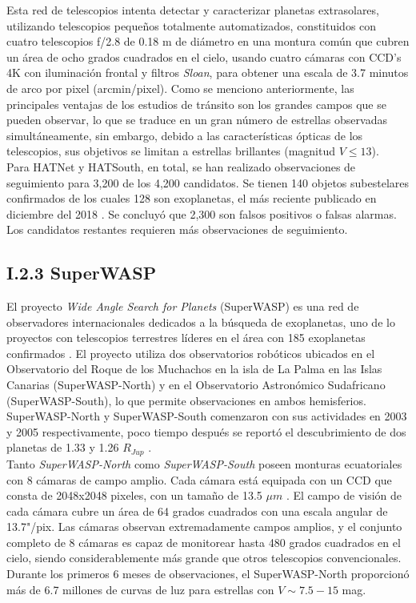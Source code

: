 Esta red de telescopios intenta detectar y caracterizar planetas extrasolares, utilizando telescopios pequeños totalmente automatizados, constituidos con cuatro telescopios f/2.8 de 0.18 m de diámetro en una montura común que cubren un área de ocho grados cuadrados en el cielo, usando cuatro cámaras con CCD's 4K con iluminación frontal y filtros \textit{Sloan}, para obtener una escala de 3.7 minutos de arco por pixel (arcmin/pixel). Como se menciono anteriormente, las principales ventajas de los estudios de tránsito son los grandes campos que se pueden observar, lo que se traduce en un gran número de estrellas observadas simultáneamente, sin embargo, debido a las características ópticas de los telescopios, sus objetivos se limitan a estrellas brillantes (magnitud $V \leq 13$).\\

Para HATNet y HATSouth, en total, se han realizado observaciones de seguimiento para 3,200 de los 4,200 candidatos. Se tienen 140 objetos subestelares confirmados de los cuales 128 son exoplanetas, el más reciente publicado en diciembre del 2018 \cite{bakos2018hats}. Se concluyó que 2,300 son falsos positivos o falsas alarmas. Los candidatos restantes requieren más observaciones de seguimiento.\\

\subsection*{I.2.3 SuperWASP}

El proyecto \textit{Wide Angle Search for Planets} (SuperWASP) es una red de observadores internacionales dedicados a la búsqueda de exoplanetas, uno de lo proyectos con telescopios terrestres líderes en el área con 185 exoplanetas confirmados \cite{pollacco2006wasp}. El proyecto utiliza dos observatorios robóticos ubicados en el Observatorio del Roque de los Muchachos en la isla de La Palma en las Islas Canarias (SuperWASP-North) y en el Observatorio Astronómico Sudafricano (SuperWASP-South), lo que permite observaciones en ambos hemisferios. SuperWASP-North y SuperWASP-South comenzaron con sus actividades en 2003 y 2005 respectivamente, poco tiempo después se reportó el descubrimiento de dos planetas de 1.33 y 1.26 $R_{Jup}$ \cite{cameron2007wasp}.\\


Tanto \textit{SuperWASP-North} como \textit{SuperWASP-South} poseen monturas ecuatoriales con 8 cámaras de campo amplio. Cada cámara está equipada con un CCD que consta de 2048x2048 pixeles, con un tamaño de 13.5 $	\mu m$ . El campo de visión de cada cámara cubre un área de 64 grados cuadrados con una escala angular de 13.7"/pix. Las cámaras observan extremadamente campos amplios, y el conjunto completo de 8 cámaras es capaz de monitorear hasta 480 grados cuadrados en el cielo, siendo considerablemente más grande que otros telescopios convencionales. Durante los primeros 6 meses de observaciones, el SuperWASP-North proporcionó más de 6.7 millones de curvas de luz para estrellas con $V \sim 7.5-15$ mag.\\


